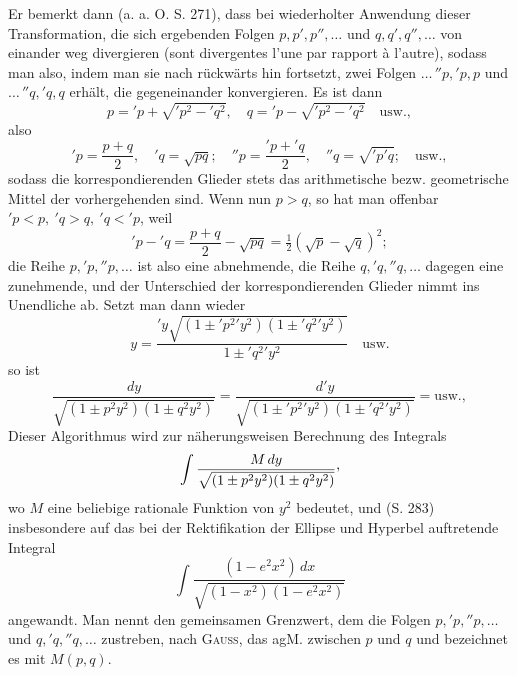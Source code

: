 \clearpage{}
\noindent Er bemerkt dann (a. a. O. S. 271), dass bei wiederholter Anwendung dieser
Transformation, die sich ergebenden Folgen \(p,p',p'',\ldots\) und \(q,q',q'',\ldots\) von
einander weg divergieren (sont divergentes l’une par rapport à l’autre), sodass
man also, indem man sie nach rückwärts hin fortsetzt, zwei Folgen \(\ldots\,{}''p,{}'p,p\)
und \(\ldots\,{}''q,{}'q,q\) erhält, die gegeneinander konvergieren. Es ist dann
\[
p={}'p+\sqrt{{}'p^2-{}'q^2},\quad q={}'p-\sqrt{{}'p^2-{}'q^2}\quad\text{usw.},
\]
also
\[
{}'p=\frac{p+q}{2},\quad {}'q=\sqrt{pq};\quad
{}''p=\frac{{}'p+{}'q}{2},\quad {}''q=\sqrt{{}'p{}'q};\quad\text{usw.},
\]
sodass die korrespondierenden Glieder stets das arithmetische bezw. geometrische
Mittel der vorhergehenden sind. Wenn nun \(p>q\), so hat man offenbar
\({}'p<p,\ {}'q>q,\ {}'q<{}'p\), weil
\[
{}'p-{}'q=\frac{p+q}{2}-\sqrt{pq}=\tfrac12(\sqrt p-\sqrt q)^2;
\]
die Reihe \(p,{}'p,{}''p,\ldots\) ist also eine abnehmende, die Reihe \(q,{}'q,{}''q,\ldots\) dagegen
eine zunehmende, und der Unterschied der korrespondierenden Glieder
nimmt ins Unendliche ab. Setzt man dann wieder
\[
y=\frac{{}'y\sqrt{(1\pm{}'p^2{}'y^2)(1\pm{}'q^2{}'y^2)}}{1\pm{}'q^2{}'y^2}\quad\text{usw.}
\]
so ist
\[
\frac{dy}{\sqrt{(1\pm p^2y^2)(1\pm q^2y^2)}}=
\frac{d{}'y}{\sqrt{(1\pm{}'p^2{}'y^2)(1\pm{}'q^2{}'y^2)}}=\text{usw.},
\]
Dieser Algorithmus wird zur näherungsweisen Berechnung des Integrals
\[
\int\frac{M\,dy}{\sqrt{(1\pm p^2y^2)(1\pm q^2y^2)}}\mathpunct{\vcenter{\hbox{,}}}
\]
wo \(M\) eine beliebige rationale Funktion von \(y^2\) bedeutet, und (S. 283) insbesondere
auf das bei der Rektifikation der Ellipse und Hyperbel auftretende
Integral
\[
\int\frac{(1-e^2x^2)\,dx}{\sqrt{(1-x^2)(1-e^2x^2)}}
\]
angewandt. Man nennt den gemeinsamen Grenzwert, dem die Folgen \(p,{}'p,
{}''p,\ldots\) und \(q,{}'q,{}''q,\ldots\) zustreben, nach \textsc{Gauss}, das agM. zwischen \(p\) und \(q\)
und bezeichnet es mit \(M(p,q)\).

